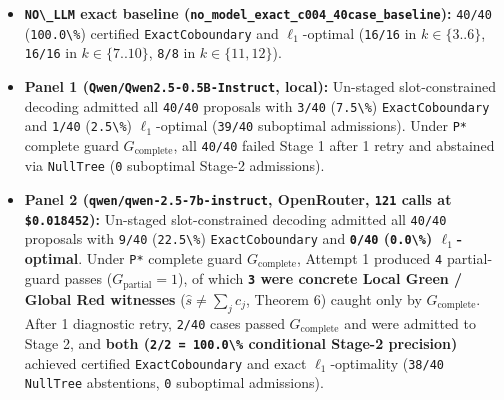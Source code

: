 \documentclass[
  11pt,
]{article}
\newcommand{\passthrough}[1]{#1}
\providecommand{\tightlist}{%
  \setlength{\itemsep}{0pt}\setlength{\parskip}{0pt}}
\begin{document}
\begin{itemize}
\tightlist
\item
  \textbf{\passthrough{\lstinline!NO\_LLM!} exact baseline
  (\nolinkurl{no_model_exact_c004_40case_baseline}):}
  \passthrough{\lstinline!40/40!} (\passthrough{\lstinline!100.0\%!})
  certified \nolinkurl{ExactCoboundary} and \(\ell_1\)-optimal
  (\passthrough{\lstinline!16/16!} in \(k \in \{3..6\}\),
  \passthrough{\lstinline!16/16!} in \(k \in \{7..10\}\),
  \passthrough{\lstinline!8/8!} in \(k \in \{11,\allowbreak  12\}\)).
\item
  \textbf{Panel 1 (\nolinkurl{Qwen/Qwen2.5-0.5B-Instruct}, local):}
  Un-staged slot-constrained decoding admitted all
  \passthrough{\lstinline!40/40!} proposals with
  \passthrough{\lstinline!3/40!} (\passthrough{\lstinline!7.5\%!})
  \nolinkurl{ExactCoboundary} and \passthrough{\lstinline!1/40!}
  (\passthrough{\lstinline!2.5\%!}) \(\ell_1\)-optimal
  (\passthrough{\lstinline!39/40!} suboptimal admissions). Under
  \passthrough{\lstinline!P*!} complete guard \(G_{\text{complete}}\),
  all \passthrough{\lstinline!40/40!} failed Stage 1 after 1 retry and
  abstained via \passthrough{\lstinline!NullTree!}
  (\passthrough{\lstinline!0!} suboptimal Stage-2 admissions).
\item
  \textbf{Panel 2 (\nolinkurl{qwen/qwen-2.5-7b-instruct}, OpenRouter,
  \passthrough{\lstinline!121!} calls at
  \passthrough{\lstinline!$0.018452!}):} Un-staged slot-constrained
  decoding admitted all \passthrough{\lstinline!40/40!} proposals with
  \passthrough{\lstinline!9/40!} (\passthrough{\lstinline!22.5\%!})
  \nolinkurl{ExactCoboundary} and \textbf{\passthrough{\lstinline!0/40!}
  (\passthrough{\lstinline!0.0\%!}) \(\ell_1\)-optimal}. Under
  \passthrough{\lstinline!P*!} complete guard \(G_{\text{complete}}\),
  Attempt 1 produced \passthrough{\lstinline!4!} partial-guard passes
  (\(G_{\text{partial}} = 1\)), of which
  \textbf{\passthrough{\lstinline!3!} were concrete Local Green / Global
  Red witnesses} (\(\hat{s} \ne \sum_j c_j\), Theorem 6) caught only by
  \(G_{\text{complete}}\). After 1 diagnostic retry,
  \passthrough{\lstinline!2/40!} cases passed \(G_{\text{complete}}\)
  and were admitted to Stage 2, and \textbf{both
  (\passthrough{\lstinline!2/2 = 100.0\%!} conditional Stage-2
  precision)} achieved certified \nolinkurl{ExactCoboundary} and exact
  \(\ell_1\)-optimality (\passthrough{\lstinline!38/40!}
  \passthrough{\lstinline!NullTree!} abstentions,
  \passthrough{\lstinline!0!} suboptimal admissions).
\end{itemize}
\end{document}
